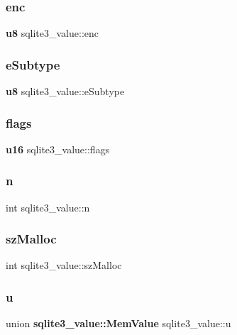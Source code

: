 \subsubsection{enc}
{\footnotesize\ttfamily \textbf{ u8} sqlite3\+\_\+value\+::enc}

\mbox{\label{structsqlite3__value_ae59191dcf28e21cdf26b551ecc18b4c6}} 
\subsubsection{eSubtype}
{\footnotesize\ttfamily \textbf{ u8} sqlite3\+\_\+value\+::e\+Subtype}

\mbox{\label{structsqlite3__value_a83d279b3d99f2d6b202cb269dc5afb8b}} 
\subsubsection{flags}
{\footnotesize\ttfamily \textbf{ u16} sqlite3\+\_\+value\+::flags}

\mbox{\label{structsqlite3__value_acf4481e6fcff5216526151a9adb1715c}} 
\subsubsection{n}
{\footnotesize\ttfamily int sqlite3\+\_\+value\+::n}

\mbox{\label{structsqlite3__value_a5337b409ea8d315f5d376fadef8a61cc}} 
\subsubsection{szMalloc}
{\footnotesize\ttfamily int sqlite3\+\_\+value\+::sz\+Malloc}

\mbox{\label{structsqlite3__value_a619b76757012d96d688b2fa8553921a5}} 
\subsubsection{u}
{\footnotesize\ttfamily union \textbf{ sqlite3\+\_\+value\+::\+Mem\+Value}  sqlite3\+\_\+value\+::u}

